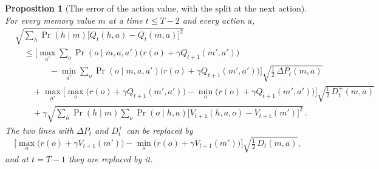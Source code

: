 \documentclass[11pt]{article}
\newtheorem{proposition}{Proposition}
\theoremstyle{definition}
\newcommand{\dP}{\Delta P}
\begin{document}
\begin{proposition}[The error of the action value, with the split at the next action]\label{prop:q}
For every memory value $m$ at a time $t\le T-2$ and every action $a$,
\begin{align*}
&\sqrt{\sum_h\Pr(h\mid m)\big[Q_t(h,a)-Q_t(m,a)\big]^2}\\
&\quad\le\Big[\max_{a'}\sum_o\Pr(o\mid m,a,a')\big(r(o)+\gamma Q_{t+1}(m',a')\big)\\
&\qquad\qquad-\min_{a'}\sum_o\Pr(o\mid m,a,a')\big(r(o)+\gamma Q_{t+1}(m',a')\big)\Big]\sqrt{\tfrac12\,\dP_t(m,a)}\\
&\qquad+\max_{a'}\Big[\max_o\big(r(o)+\gamma Q_{t+1}(m',a')\big)-\min_o\big(r(o)+\gamma Q_{t+1}(m',a')\big)\Big]\sqrt{\tfrac12\,D^+_t(m,a)}\\
&\qquad+\gamma\sqrt{\sum_h\Pr(h\mid m)\sum_o\Pr(o\mid h,a)\big[V_{t+1}(h,a,o)-V_{t+1}(m')\big]^2}\,.
\end{align*}
The two lines with $\dP_t$ and $D^+_t$ can be replaced by
\[
\Big[\max_o\big(r(o)+\gamma V_{t+1}(m')\big)-\min_o\big(r(o)+\gamma V_{t+1}(m')\big)\Big]\sqrt{\tfrac12\,D_t(m,a)},
\]
and at $t=T-1$ they are replaced by it.
\end{proposition}
\end{document}
